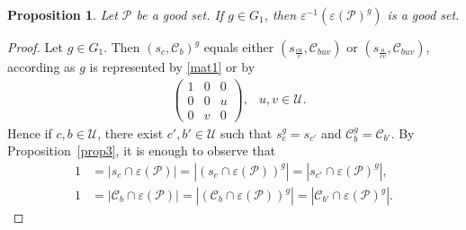 \documentclass[11pt]{article}
\newtheorem{prop}[theorem]{Proposition}
\theoremstyle{definition}
\numberwithin{equation}{section}
\def\eps{\varepsilon}
\def\cC{\mathscr C}
\def\cP{\mathcal P}
\def\cU{\mathcal U}
\def\cY{\mathcal Y}
\begin{document}
\begin{prop}\label{prop4}
    Let $\cP$ be a good set. If $g \in G_1$, then $\eps^{-1}\left(\eps(\cP)^g\right)$ is a good set.
\end{prop}
\begin{proof}
    Let $g \in G_1$. Then $\left(s_c, \cC_b\right)^g$ equals either $\left(s_\frac{cu}{v}, \cC_{buv}\right)$ or $\left(s_\frac{u}{cv}, \cC_{buv}\right)$, according as $g$ is represented by \eqref{mat1} or by
\begin{align*}
    & \begin{pmatrix}
        1 & 0 & 0 \\
        0 & 0 & u \\
        0 & v & 0
    \end{pmatrix}, & u,v \in \cU.
\end{align*}
    Hence if $c,b \in \cU$, there exist $c', b' \in \cU$ such that $s_c^g = s_{c'}$ and $\cC_b^g = \cC_{b'}$. By Proposition~\ref{prop3}, it is enough to observe that 
    \begin{align*}
        1 & = |s_c \cap \eps(\cP)|
        = |\left(s_c \cap \eps(\cP)\right)^g| 
        = |s_{c'} \cap \eps(\cP)^g|, \\
        1 & = |\cC_b \cap \eps(\cP)|
        = |\left(\cC_b \cap \eps(\cP)\right)^g| 
        = |\cC_{b'} \cap \eps(\cP)^g|.
    \end{align*}
\end{proof}
\end{document}
